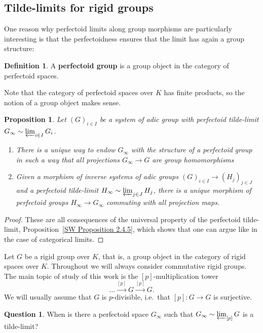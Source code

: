 \documentclass[10pt,oneside]{amsart}
\newtheorem{proposition}[theorem]{Proposition}
\theoremstyle{definition}
\newtheorem{definition}[theorem]{Definition}
\newtheorem{question}[mainthm]{Question}
\begin{document}
\subsection{Tilde-limits for rigid groups}

One reason why perfectoid limits along group morphisms are particularly interesting is that the perfectoidness ensures that the limit has again a group structure:

\begin{definition}
	A \textbf{perfectoid group} is a group object in the category of perfectoid spaces.
\end{definition}

Note that the category of perfectoid spaces over $K$ has finite products, so the notion of a group object makes sense. 

\begin{proposition}\label{perfectoid tilde-limit is perfectoid group in a functorial way}
	Let $(G)_{i\in I}$ be a system of adic group with perfectoid tilde-limit $G_\infty\sim \varprojlim_{i\in I}G_i$.
	\begin{enumerate}
		\item  There is a unique way to endow $G_\infty$ with the structure of a perfectoid group in such a way that all projections $G_\infty\rightarrow G$ are group homomorphisms
		\item Given a morphism of inverse systems of adic groups $(G)_{i\in I}\to (H_j)_{j\in J}$ and a perfectoid tilde-limit $H_\infty\sim\varprojlim_{j\in J}H_j$, there is a unique morphism of perfectoid groups $H_\infty\rightarrow G_\infty$
		commuting with all projection maps.
	\end{enumerate}
\end{proposition}
\begin{proof}
	These are all consequences of the universal property of the perfectoid tilde-limit, Proposition~\ref{SW Proposition 2.4.5}, which shows that one can argue like in the case of categorical limits.
\end{proof}


Let $G$ be a rigid group over $K$, that is, a group object in the category of rigid spaces over $K$. Throughout we will always consider commutative rigid groups. The main topic of study of this work is the $[p]$-multiplication tower
\[ \dots\xrightarrow{[p]}G\xrightarrow{[p]}G.\]
We will usually assume that $G$ is $p$-divisible, i.e.\ that $[p]:G\to G$ is surjective.
\begin{question}
	When is there a perfectoid space $G_\infty$ such that $G_\infty \sim \varprojlim_{[p]} G$ is a tilde-limit?
\end{question}
\end{document}
